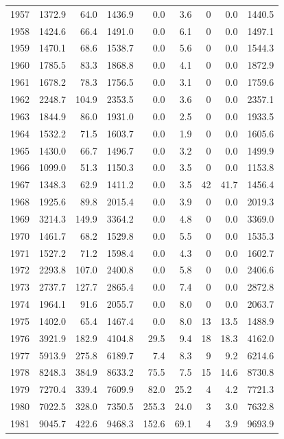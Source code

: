 \documentclass[12pt,]{article}
\begin{document}
\begin{longtable}{rrrrrrrrr}
  1957 & 1372.9 & 64.0 & 1436.9 & 0.0 & 3.6 & 0 & 0.0 & 1440.5 \\ 
  1958 & 1424.6 & 66.4 & 1491.0 & 0.0 & 6.1 & 0 & 0.0 & 1497.1 \\ 
  1959 & 1470.1 & 68.6 & 1538.7 & 0.0 & 5.6 & 0 & 0.0 & 1544.3 \\ 
  1960 & 1785.5 & 83.3 & 1868.8 & 0.0 & 4.1 & 0 & 0.0 & 1872.9 \\ 
  1961 & 1678.2 & 78.3 & 1756.5 & 0.0 & 3.1 & 0 & 0.0 & 1759.6 \\ 
  1962 & 2248.7 & 104.9 & 2353.5 & 0.0 & 3.6 & 0 & 0.0 & 2357.1 \\ 
  1963 & 1844.9 & 86.0 & 1931.0 & 0.0 & 2.5 & 0 & 0.0 & 1933.5 \\ 
  1964 & 1532.2 & 71.5 & 1603.7 & 0.0 & 1.9 & 0 & 0.0 & 1605.6 \\ 
  1965 & 1430.0 & 66.7 & 1496.7 & 0.0 & 3.2 & 0 & 0.0 & 1499.9 \\ 
  1966 & 1099.0 & 51.3 & 1150.3 & 0.0 & 3.5 & 0 & 0.0 & 1153.8 \\ 
  1967 & 1348.3 & 62.9 & 1411.2 & 0.0 & 3.5 & 42 & 41.7 & 1456.4 \\ 
  1968 & 1925.6 & 89.8 & 2015.4 & 0.0 & 3.9 & 0 & 0.0 & 2019.3 \\ 
  1969 & 3214.3 & 149.9 & 3364.2 & 0.0 & 4.8 & 0 & 0.0 & 3369.0 \\ 
  1970 & 1461.7 & 68.2 & 1529.8 & 0.0 & 5.5 & 0 & 0.0 & 1535.3 \\ 
  1971 & 1527.2 & 71.2 & 1598.4 & 0.0 & 4.3 & 0 & 0.0 & 1602.7 \\ 
  1972 & 2293.8 & 107.0 & 2400.8 & 0.0 & 5.8 & 0 & 0.0 & 2406.6 \\ 
  1973 & 2737.7 & 127.7 & 2865.4 & 0.0 & 7.4 & 0 & 0.0 & 2872.8 \\ 
  1974 & 1964.1 & 91.6 & 2055.7 & 0.0 & 8.0 & 0 & 0.0 & 2063.7 \\ 
  1975 & 1402.0 & 65.4 & 1467.4 & 0.0 & 8.0 & 13 & 13.5 & 1488.9 \\ 
  1976 & 3921.9 & 182.9 & 4104.8 & 29.5 & 9.4 & 18 & 18.3 & 4162.0 \\ 
  1977 & 5913.9 & 275.8 & 6189.7 & 7.4 & 8.3 & 9 & 9.2 & 6214.6 \\ 
  1978 & 8248.3 & 384.9 & 8633.2 & 75.5 & 7.5 & 15 & 14.6 & 8730.8 \\ 
  1979 & 7270.4 & 339.4 & 7609.9 & 82.0 & 25.2 & 4 & 4.2 & 7721.3 \\ 
  1980 & 7022.5 & 328.0 & 7350.5 & 255.3 & 24.0 & 3 & 3.0 & 7632.8 \\ 
  1981 & 9045.7 & 422.6 & 9468.3 & 152.6 & 69.1 & 4 & 3.9 & 9693.9 \\ 

\end{longtable}
\end{document}
